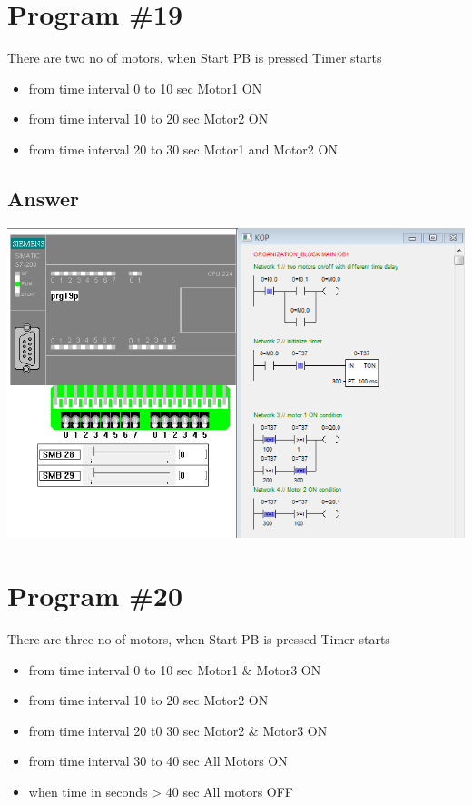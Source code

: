 \documentclass[
	12pt, %
]{fphw}
\begin{document}
\section*{Program \#19}
\begin{problem}
 There are two no of motors, when Start PB is pressed Timer starts \medskip
\begin{itemize}
\item from time interval 0 to 10 sec Motor1 ON
\item from time interval 10 to 20 sec Motor2 ON
\item from time interval 20 to 30 sec Motor1 and Motor2 ON
\end{itemize}
\end{problem}
\subsection*{Answer}
\begin{center}
\includegraphics[width = 165mm, scale =0.9]{prg19p.png}
\end{center}
\section*{Program \#20}
\begin{problem}
  There are three no of motors, when Start PB is pressed Timer starts \medskip
\begin{itemize}
 \item from time interval 0 to 10 sec Motor1 \& Motor3 ON
 \item from time interval 10 to 20 sec Motor2 ON
 \item from time interval 20 t0 30 sec Motor2 \& Motor3 ON
 \item from time interval 30 to 40 sec All Motors ON
 \item when time in seconds > 40 sec All motors OFF
\end{itemize}
\end{problem}
\end{document}
